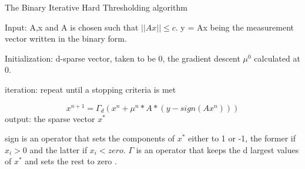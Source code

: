 \begin{algorithm}
	\caption{The Binary Iterative Hard Thresholding algorithm}
Input: A,x and A is chosen such that $ ||Ax|| \leq c $. y = Ax being the measurement vector written in the binary form. 

Initialization: d-sparse vector, taken to be $ 0 $, the gradient descent $ \mu^0 $ calculated at $ 0 $. 

iteration: repeat until a stopping criteria is met

\begin{equation}\label{key}
x^{n+1} = \Gamma_d(x^n+ \mu^{n} * A* (y - sign(Ax^n)))
\end{equation}  
output: the sparse vector $ x^{*} $
\end{algorithm}
sign is an operator that sets the components of $ x^{*} $ either to 1 or -1, the former if $ x_i > 0$ and the latter if $ x_i < zero $. $ \Gamma $ is an operator that keeps the d largest values of $ x^{*} $ and sets the rest to zero \cite{biht}. 
   
 
  
